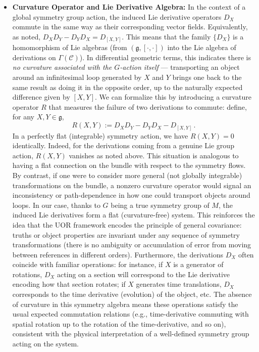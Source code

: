 \documentclass[12pt]{article}
\begin{document}
\begin{itemize}
    \item \textbf{Curvature Operator and Lie Derivative Algebra:} In the context of a global symmetry group action, the induced Lie derivative operators $D_X$ commute in the same way as their corresponding vector fields. Equivalently, as noted, $D_X D_Y - D_Y D_X = D_{[X,Y]}$. This means that the family $\{D_X\}$ is a homomorphism of Lie algebras (from $(\mathfrak{g}, [\cdot,\cdot])$ into the Lie algebra of derivations on $\Gamma(\mathcal{C})$). In differential geometric terms, this indicates there is \emph{no curvature associated with the $G$-action itself} — transporting an object around an infinitesimal loop generated by $X$ and $Y$ brings one back to the same result as doing it in the opposite order, up to the naturally expected difference given by $[X,Y]$. We can formalize this by introducing a curvature operator $R$ that measures the failure of two derivations to commute: define, for any $X,Y \in \mathfrak{g}$,
    \[
        R(X, Y) := D_X D_Y - D_Y D_X - D_{[X,Y]}\,.
    \] 
    In a perfectly flat (integrable) symmetry action, we have $R(X,Y) = 0$ identically. Indeed, for the derivations coming from a genuine Lie group action, $R(X,Y)$ vanishes as noted above. This situation is analogous to having a flat connection on the bundle with respect to the symmetry flows. By contrast, if one were to consider more general (not globally integrable) transformations on the bundle, a nonzero curvature operator would signal an inconsistency or path-dependence in how one could transport objects around loops. In our case, thanks to $G$ being a true symmetry group of $M$, the induced Lie derivatives form a flat (curvature-free) system. This reinforces the idea that the UOR framework encodes the principle of general covariance: truths or object properties are invariant under any sequence of symmetry transformations (there is no ambiguity or accumulation of error from moving between references in different orders). Furthermore, the derivations $D_X$ often coincide with familiar operations: for instance, if $X$ is a generator of rotations, $D_X$ acting on a section will correspond to the Lie derivative encoding how that section rotates; if $X$ generates time translations, $D_X$ corresponds to the time derivative (evolution) of the object, etc. The absence of curvature in this symmetry algebra means these operations satisfy the usual expected commutation relations (e.g., time-derivative commuting with spatial rotation up to the rotation of the time-derivative, and so on), consistent with the physical interpretation of a well-defined symmetry group acting on the system.
\end{itemize}
\end{document}
